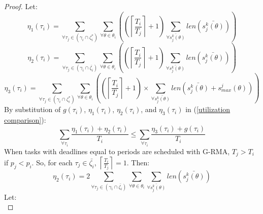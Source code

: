 \begin{proof}
Let:
%
\begin{equation*}
\eta_{1}(\tau_{i})=\sum_{\forall\tau_{j}\in(\gamma_{i}\cap\zeta_{i}^{*})}\sum_{\forall\theta\in\theta_{i}}\left(\left(\left\lceil \frac{T_{i}}{T_{j}}\right\rceil +1\right)\sum_{\bar{\forall s_{j}^{k}(\theta)}}len\left(\bar{s_{j}^{k}(\theta)}\right)\right)
\end{equation*}
%
\begin{equation*}
\eta_{2}(\tau_{i})=\sum_{\forall\tau_{j}\in(\gamma_{i}\cap\bar{\zeta_{i}})}\sum_{\forall\theta\in\theta_{i}}\left(\left(\left\lceil \frac{T_{i}}{T_{j}}\right\rceil +1\right)\sum_{\bar{\forall s_{j}^{k}(\theta)}}len\left(\bar{s_{j}^{k}(\theta)}\right)\right)
\end{equation*}
%
%
\begin{equation*}
\eta_{3}(\tau_{i}) = \sum_{\forall\tau_{j}\in(\gamma_{i}\cap\zeta_{i}^{*})}\sum_{\forall\theta\in\theta_{i}}\left(\left(\left\lceil \frac{T_{i}}{T_{j}}\right\rceil +1\right)\times \sum_{\forall\bar{s_{j}^{k}(\theta)}}len\left(\bar{s_{j}^{k}(\theta)}+s_{max}^{j}(\theta)\right)\right)
\end{equation*}
%
By substitution of $g(\tau_i)$, $\eta_1(\tau_i)$, $\eta_2(\tau_i)$, and $\eta_3(\tau_i)$ in (\ref{utilization comparison}):
%
\begin{equation}
\sum_{\forall\tau_{i}}\frac{\eta_{1}(\tau_{i})+\eta_{2}(\tau_{i})}{T_{i}}\le\sum_{\forall\tau_{i}}\frac{\eta_{3}(\tau_{i})+g(\tau_{i})}{T_{i}}
\label{PNF rcm comparison 3}
\end{equation}
%
When tasks with deadlines equal to periods are scheduled with G-RMA, $T_{j}>T_{i}$ if $p_{j}<p_{i}$. So, for each $\tau_{j}\in\bar{\zeta_{i}}$, $\left\lceil \frac{T_{i}}{T_{j}}\right\rceil =1$. Then:
%
\begin{equation}
\eta_{2}(\tau_{i})=2\sum_{\forall\tau_{j}\in(\gamma_{i}\cap\bar{\zeta_{i}})}\sum_{\forall\theta\in\theta_{i}}\sum_{\bar{\forall s_{j}^{k}(\theta)}}len\left(\bar{s_{j}^{k}(\theta)}\right)
\label{PNF rcm comparison 5}
\end{equation}
%
Let:
%
\begin{equation*}

\end{equation*}
\end{proof}
